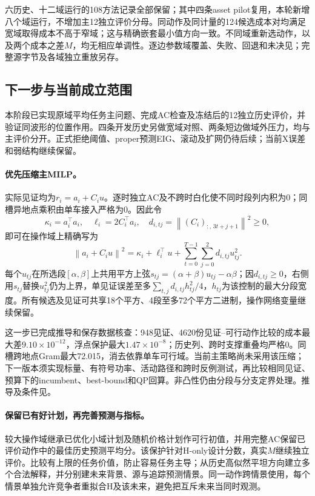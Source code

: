 \documentclass[UTF8,fontset=fandol,11pt,a4paper]{ctexart}
\newcommand{\norm}[1]{\left\lVert#1\right\rVert}
\begin{document}
六历史、十二域运行的108方法记录全部保留；其中四条asset pilot复用，本轮新增八个域运行，不增加主12独立评价分母。同动作及同计量的124候选成本对均满足宽域取得成本不高于窄域；这与精确嵌套最小值方向一致。不同域重新选动作，以及两个成本之差$M$，均无相应单调性。逐边参数域覆盖、失败、回退和未决见；完整源字节及各域独立重放另存。


\subsection{下一步与当前成立范围}
本阶段已实现原域平均任务主问题、完成AC检查及冻结后的12独立历史评价，并验证同波形的位置作用。四条开发历史另做宽域对照、两条短边做域外压力，均与主评价分开。正式拒绝阈值、proper预测EIG、滚动及扩网仍待后续；当前X误差和弱结构继续保留。

\paragraph{优先压缩主MILP。}
实际见证均为$r_i=a_i+C_iu$。逐时独立AC及不跨时白化使不同时段列内积为0；同槽异地点乘积由单车接入严格为0。因此令
\[
\kappa_i=a_i^\top a_i,\quad\ell_i=2C_i^\top a_i,
\quad d_{i,tj}=\norm{(C_i)_{:,\,3t+j+1}}^2\ge0,
\]
即可在操作域上精确写为
\begin{equation}
\norm{a_i+C_iu}^2=\kappa_i+\ell_i^\top u+\sum_{t=0}^{T-1}\sum_{j=0}^{2}d_{i,tj}u_{tj}^2.
\label{eq:original-shared-square}
\end{equation}
每个$u_{tj}$在所选段$[\alpha,\beta]$上共用平方上弦$s_{tj}=(\alpha+\beta)u_{tj}-\alpha\beta$；因$d_{i,tj}\ge0$，右侧用$s_{tj}$替换$u_{tj}^2$仍为上界，单见证误差至多$\sum_{t,j}d_{i,tj}h_{tj}^2/4$，$h_{tj}$为该控制的最大分段宽度。所有候选及见证可共享18个平方、4段至多72个平方二进制，操作网络变量继续保留。

这一步已完成推导和保存数据核查：948见证、4620份见证--可行动作比较的成本最大差$9.10\times10^{-12}$，浮点保护最大$1.47\times10^{-8}$；历史列、跨时支撑重叠均严格0。同槽跨地点Gram最大72.015，消去依靠单车可行域。当前主策略尚未采用该压缩；下一版本须实现标量、有符号功率、活动路径和跨时反例测试，再比较相同见证、预算下的incumbent、best-bound和QP回算。非凸性仍由分段与分支定界处理。推导及条件见。

\paragraph{保留已有好计划，再完善预测与指标。}
较大操作域继承已优化小域计划及随机价格计划作可行初值，并用完整AC保留已评价动作中的最佳历史预测平均分。该保护针对H-only设计分数，真实$M$继续独立评价。比较有上限的任务价值，防止容易任务主导；从历史高似然平坦方向建立多个合法解释，并分别建未来背景、源与追踪预测情景。同一动作跨情景使用，每个情景单独允许竞争者重拟合H及该未来，避免把互斥未来当同时观测。
\end{document}
